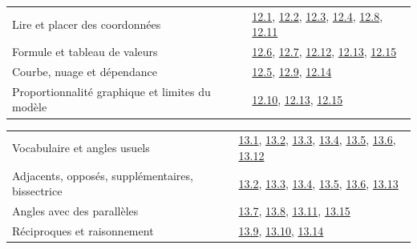 \begin{tabularx}{\linewidth}{@{}Yl@{}}\toprule
Lire et placer des coordonnées & \hyperref[exo-12-1]{12.1}, \hyperref[exo-12-2]{12.2}, \hyperref[exo-12-3]{12.3}, \hyperref[exo-12-4]{12.4}, \hyperref[exo-12-8]{12.8}, \hyperref[exo-12-11]{12.11}\\[2mm]
Formule et tableau de valeurs & \hyperref[exo-12-6]{12.6}, \hyperref[exo-12-7]{12.7}, \hyperref[exo-12-12]{12.12}, \hyperref[exo-12-13]{12.13}, \hyperref[exo-12-15]{12.15}\\[2mm]
Courbe, nuage et dépendance & \hyperref[exo-12-5]{12.5}, \hyperref[exo-12-9]{12.9}, \hyperref[exo-12-14]{12.14}\\[2mm]
Proportionnalité graphique et limites du modèle & \hyperref[exo-12-10]{12.10}, \hyperref[exo-12-13]{12.13}, \hyperref[exo-12-15]{12.15}\\[2mm]
\bottomrule\end{tabularx}\par\vspace{4mm}
\clearpage
{}\fontsize{10}{13}\selectfont
{}\begin{tabularx}{\linewidth}{@{}Yl@{}}\toprule
Vocabulaire et angles usuels & \hyperref[exo-13-1]{13.1}, \hyperref[exo-13-2]{13.2}, \hyperref[exo-13-3]{13.3}, \hyperref[exo-13-4]{13.4}, \hyperref[exo-13-5]{13.5}, \hyperref[exo-13-6]{13.6}, \hyperref[exo-13-12]{13.12}\\[2mm]
Adjacents, opposés, supplémentaires, bissectrice & \hyperref[exo-13-2]{13.2}, \hyperref[exo-13-3]{13.3}, \hyperref[exo-13-4]{13.4}, \hyperref[exo-13-5]{13.5}, \hyperref[exo-13-6]{13.6}, \hyperref[exo-13-13]{13.13}\\[2mm]
Angles avec des parallèles & \hyperref[exo-13-7]{13.7}, \hyperref[exo-13-8]{13.8}, \hyperref[exo-13-11]{13.11}, \hyperref[exo-13-15]{13.15}\\[2mm]
Réciproques et raisonnement & \hyperref[exo-13-9]{13.9}, \hyperref[exo-13-10]{13.10}, \hyperref[exo-13-14]{13.14}\\[2mm]
\bottomrule\end{tabularx}\par\vspace{4mm}

